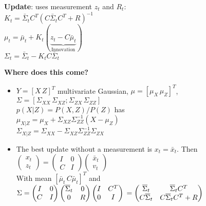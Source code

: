 \textbf{Update}: uses measurement $z_t$ and $R_t$:\\
$K_t = \bar{\Sigma}_t C^T (C \bar{\Sigma}_t C^T + R)^{-1}$ \\
$\mu_t = \bar{\mu}_t + K_t (\underbrace{z_t - C
\bar{\mu}_t}_{\text{Innovation}})$ \\
$\Sigma_t = \bar{\Sigma}_t - K_t C \bar{\Sigma}_t$

\textbf{Where does this come?}
\begin{itemize}
  \item 
  $Y = [X \, Z]^T$ multivariate Gaussian, $\mu = [\mu_X \, \mu_Z]^T$,\\
  $\Sigma = [\Sigma_{XX} \, \Sigma_{XZ}; \Sigma_{ZX} \, \Sigma_{ZZ}]$\\
  $p(X|Z) = P(X, Z)/P(Z)$ has \\
  $\mu_{X|Z} = \mu_X + \Sigma_{XZ} \Sigma_{ZZ}^{-1}(X - \mu_Z)$\\
  $\Sigma_{X|Z} = \Sigma_{XX} - \Sigma_{XZ} \Sigma_{ZZ}^{-1} \Sigma_{ZX}$
\item The best update without a measurement is $x_t = \bar{x}_t$. Then\\
  $\begin{pmatrix}x_t \\ z_t\end{pmatrix} = 
  \begin{pmatrix}I & 0\\ C & I\end{pmatrix}
  \begin{pmatrix}\bar{x}_t \\ v_t\end{pmatrix}$ \\
  With mean  $[\bar{\mu}_t \, C\bar{\mu}_t]^T$ and\\
  $ \Sigma = 
  \begin{pmatrix}
    I & 0 \\ C & I
  \end{pmatrix}
  \begin{pmatrix}
    \bar{\Sigma}_t & 0 \\ 0 & R
  \end{pmatrix}
  \begin{pmatrix}
    I & C^T \\ 0 & I
  \end{pmatrix}\\
  =
  \begin{pmatrix}
    \bar{\Sigma}_t & \bar{\Sigma}_t C^T \\
    C \bar{\Sigma}_t & C \bar{\Sigma}_t C^T + R
  \end{pmatrix}
  $
\end{itemize}

